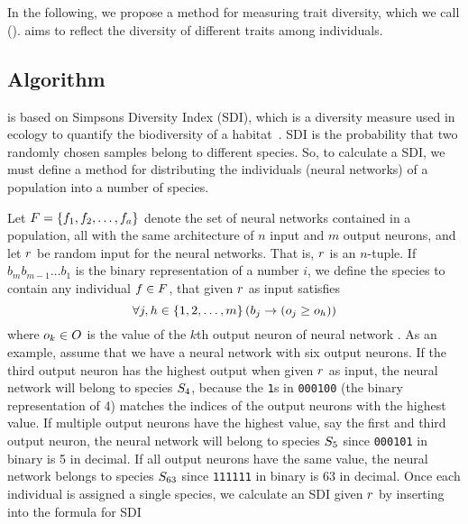 \section{\di{}}\label{sec:nntd}
In the following, we propose a method for measuring trait diversity, which we call \emph{\di{}} (\dia). \dia{} aims to reflect the diversity of different traits among individuals. 

\subsection{Algorithm}
\dia{} is based on Simpsons Diversity Index (SDI), which is a diversity measure used in ecology to quantify the biodiversity of a habitat~\cite{simpson1949measurement}. SDI is the probability that two randomly chosen samples belong to different species\cite{Venturi2007182}. So, to calculate a SDI, we must define a method for distributing the individuals (neural networks) of a population into a number of species.

Let $F = \left\{ f_1, f_2, \dots, f_a \right\}$ denote the set of neural networks contained in a population, all with the same architecture of $n$ input and $m$ output neurons, and let $r$ be random input for the neural networks. That is, $r$ is an $n$-tuple. If $b_{m}b_{m-1}\dots b_1$ is the binary representation of a number $i$,
we define the species  to contain any individual $f \in F$, that given $r$ as input satisfies
%
\begin{equation}\label{eq:nntdbucket}
  \forall j, h \in \left\{ 1, 2, \dots, m \right\} \left(b_j \rightarrow \left(o_j \geq o_h\right)\right)
\end{equation}
%
where $o_k \in O$ is the value of the $k$th output neuron of neural network \ind. As an example, assume that we have a neural network with six output neurons. If the third output neuron has the highest output when given $r$ as input, the neural network will belong to species $S_4$, because the \texttt{1}s in \texttt{000100} (the binary representation of 4) matches the indices of the output neurons with the highest value. If multiple output neurons have the highest value, say the first and third output neuron, the neural network will belong to species $S_5$ since \texttt{000101} in binary is 5 in decimal. If all output neurons have the same value, the neural network belongs to species $S_{63}$ since \texttt{111111} in binary is 63 in decimal.
Once each individual is assigned a single species, we calculate an SDI given $r$ by inserting into the formula for SDI\cite{Venturi2007182}

